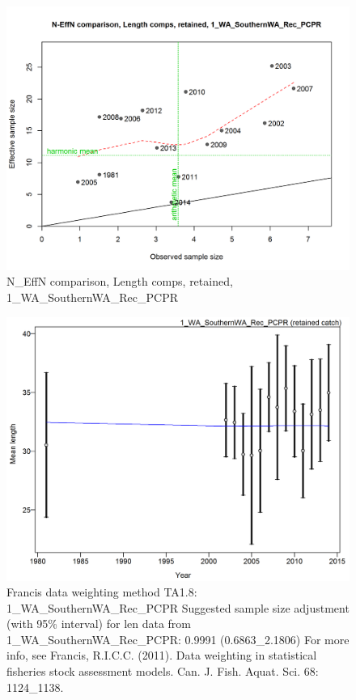 \documentclass[12pt,]{article}
\begin{document}
\begin{figure}[htbp]
\centering
\includegraphics{./r4ss/plots_mod1/comp_lenfit_sampsize_flt1mkt2.png}
\caption{N\_EffN comparison, Length comps, retained,
1\_WA\_SouthernWA\_Rec\_PCPR
\label{fig:mod1_3_comp_lenfit_sampsize_flt1mkt2}}
\end{figure}

\begin{figure}[htbp]
\centering
\includegraphics{./r4ss/plots_mod1/comp_lenfit_data_weighting_TA1.8_1_WA_SouthernWA_Rec_PCPR.png}
\caption{Francis data weighting method TA1.8:
1\_WA\_SouthernWA\_Rec\_PCPR Suggested sample size adjustment (with 95\%
interval) for len data from 1\_WA\_SouthernWA\_Rec\_PCPR: 0.9991
(0.6863\_2.1806) For more info, see Francis, R.I.C.C. (2011). Data
weighting in statistical fisheries stock assessment models. Can. J.
Fish. Aquat. Sci. 68: 1124\_1138.
\label{fig:mod1_4_comp_lenfit_data_weighting_TA1.8_1_WA_SouthernWA_Rec_PCPR}}
\end{figure}
\end{document}
